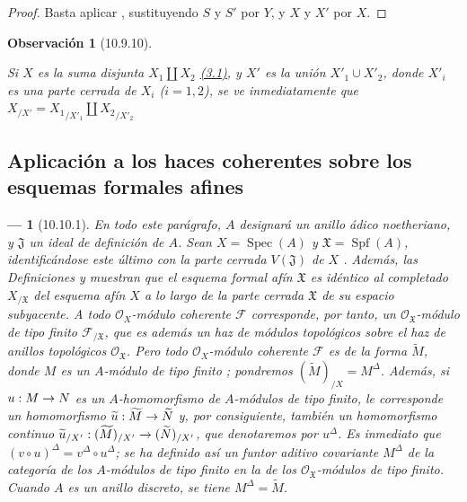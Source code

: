 \documentclass[oneside]{amsart}
\theoremstyle{ega-env-style}
\newtheorem*{env}{---}
\theoremstyle{ega-thm-env-style}
\theoremstyle{ega-defn-env-style}
\newtheorem*{remark}{Observación}
\renewcommand{\to}{\mathchoice{\longrightarrow}{\rightarrow}{\rightarrow}{\rightarrow}}
\newcommand{\oldpage}[2][]{{\marginnote{\normalfont{\textbf{#1}~|~#2}}}\ignorespaces}
\let\EGAOriginalLabel\label
\renewcommand{\label}[1]{\phantomsection\EGAOriginalLabel{#1}}
\begin{document}
\begin{proof}
Basta aplicar , sustituyendo $S$ y $S'$ por $Y$, y $X$ y $X'$ por $X$.
\end{proof}


\oldpage[I]{201}
\begin{remark}[10.9.10]
\label{I.10.9.10}

Si $X$ es la suma disjunta $X_1\amalg X_2$ \hyperref[subsection:I.3.1]{(3.1)}, y $X'$ es la unión $X'_1\cup X'_2$, donde $X'_i$ es una parte cerrada de $X_i$ ($i=1,2$), se ve inmediatamente que
$X_{/X'}={X_1}_{/X'_1}\amalg {X_2}_{/X'_2}$
\end{remark}

\subsection{Aplicación a los haces coherentes sobre los esquemas formales afines}
\label{subsection:I.10.10}

\begin{env}[10.10.1]
\label{I.10.10.1}
En todo este parágrafo, $A$ designará un \emph{anillo ádico noetheriano}, y $\mathfrak{J}$ un ideal de definición de $A$.
Sean $X=\operatorname{Spec}(A)$ y $\mathfrak{X}=\operatorname{Spf}(A)$, identificándose este último con la parte cerrada $V(\mathfrak{J})$ de $X$ .
Además, las Definiciones  y  muestran que el \emph{esquema formal afín $\mathfrak{X}$} es idéntico al \emph{completado $X_{/\mathfrak{X}}$} del esquema afín $X$ a lo largo de la parte cerrada $\mathfrak{X}$ de su espacio subyacente.
A todo $\mathscr{O}_X$-módulo coherente $\mathscr{F}$ corresponde, por tanto, un $\mathscr{O}_{\mathfrak{X}}$-módulo de tipo finito $\mathscr{F}_{/\mathfrak{X}}$, que es además un haz de módulos topológicos sobre el haz de anillos topológicos $\mathscr{O}_{\mathfrak{X}}$.
Pero todo $\mathscr{O}_X$-módulo coherente $\mathscr{F}$ es de la forma $\widetilde M$, donde $M$ es un $A$-módulo de tipo finito ; pondremos $(\widetilde M)_{/X}=M^\Delta$.
Además, si $u:M\to N$ es un $A$-homomorfismo de $A$-módulos de tipo finito, le corresponde un homomorfismo $\widetilde u:\widetilde M\to\widetilde N$ y, por consiguiente, también un homomorfismo continuo $\widetilde u_{/X'}:(\widetilde M)_{/X'}\to
(\widetilde N)_{/X'}$, que denotaremos por $u^\Delta$.
Es inmediato que $(v\circ u)^\Delta=v^\Delta\circ u^\Delta$; se ha definido así un \emph{funtor aditivo covariante $M^\Delta$} de la categoría de los $A$-módulos de tipo finito en la de los $\mathscr{O}_{\mathfrak{X}}$-módulos de tipo finito.
Cuando $A$ es un anillo \emph{discreto}, se tiene $M^\Delta=\widetilde M$.
\end{env}
\end{document}
